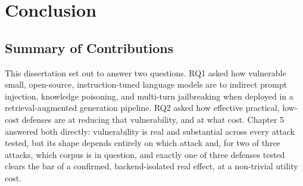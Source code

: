 \chapter{Conclusion}

\section{Summary of Contributions}

This dissertation set out to answer two questions. RQ1 asked how
vulnerable small, open-source, instruction-tuned language models are to
indirect prompt injection, knowledge poisoning, and multi-turn
jailbreaking when deployed in a retrieval-augmented generation pipeline.
RQ2 asked how effective practical, low-cost defenses are at reducing
that vulnerability, and at what cost. Chapter 5 answered both directly:
vulnerability is real and substantial across every attack tested, but
its shape depends entirely on which attack and, for two of three
attacks, which corpus is in question, and exactly one of three defenses
tested clears the bar of a confirmed, backend-isolated real effect, at a
non-trivial utility cost.

\begin{table}[H]
\centering
\renewcommand{\arraystretch}{1.3}
\caption{This dissertation's four contributions, summarized.}
\label{tab:contributions}
\end{table}
\FloatBarrier

